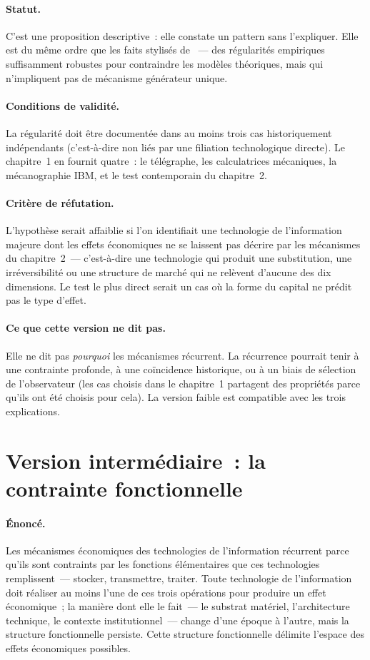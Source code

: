 \paragraph{Statut.} C'est une proposition descriptive~: elle constate un pattern sans l'expliquer. Elle est du même ordre que les faits stylisés de \textcite{kaldor_capital_1961}~--- des régularités empiriques suffisamment robustes pour contraindre les modèles théoriques, mais qui n'impliquent pas de mécanisme générateur unique.

\paragraph{Conditions de validité.} La régularité doit être documentée dans au moins trois cas historiquement indépendants (c'est-à-dire non liés par une filiation technologique directe). Le chapitre~1 en fournit quatre~: le télégraphe, les calculatrices mécaniques, la mécanographie IBM, et le test contemporain du chapitre~2.

\paragraph{Critère de réfutation.} L'hypothèse serait affaiblie si l'on identifiait une technologie de l'information majeure dont les effets économiques ne se laissent pas décrire par les mécanismes du chapitre~2~--- c'est-à-dire une technologie qui produit une substitution, une irréversibilité ou une structure de marché qui ne relèvent d'aucune des dix dimensions. Le test le plus direct serait un cas où la forme du capital ne prédit pas le type d'effet.

\paragraph{Ce que cette version ne dit pas.} Elle ne dit pas \emph{pourquoi} les mécanismes récurrent. La récurrence pourrait tenir à une contrainte profonde, à une coïncidence historique, ou à un biais de sélection de l'observateur (les cas choisis dans le chapitre~1 partagent des propriétés parce qu'ils ont été choisis pour cela). La version faible est compatible avec les trois explications.

\section{Version intermédiaire~: la contrainte fonctionnelle}

\paragraph{Énoncé.} Les mécanismes économiques des technologies de l'information récurrent parce qu'ils sont contraints par les fonctions élémentaires que ces technologies remplissent~--- stocker, transmettre, traiter. Toute technologie de l'information doit réaliser au moins l'une de ces trois opérations pour produire un effet économique~; la manière dont elle le fait~--- le substrat matériel, l'architecture technique, le contexte institutionnel~--- change d'une époque à l'autre, mais la structure fonctionnelle persiste. Cette structure fonctionnelle délimite l'espace des effets économiques possibles.

